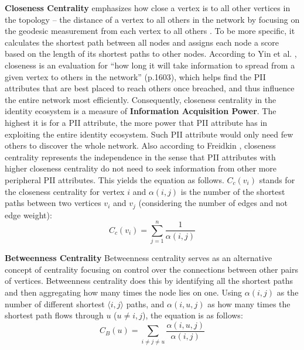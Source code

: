 \documentclass[conference]{IEEEtran}
\begin{document}
\textbf{Closeness Centrality}
  emphasizes how close a vertex is to all other vertices in the topology -- the distance of a vertex to all others in the network by focusing on the geodesic measurement from each vertex to all others  \cite{Freeman79centralityin}. To be more specific, it calculates the shortest path between all nodes and assigns each node a score based on the length of its shortest paths to other nodes. According to Yin et al. \cite{Yin2006}, closeness is an evaluation for ``how long it will take information to spread from a given vertex to others in the network'' (p.1603), which helps find the PII attributes that are best placed to reach others once breached, and thus influence the entire network most efficiently. Consequently, closeness centrality in the identity ecosystem is a measure of {\bf Information Acquisition Power}. The highest it is for a PII attribute, the more power that PII attribute has in exploiting the entire identity ecosystem. Such PII attribute would only need few others to discover the whole network. Also according to Freidkin \cite{Freidkin}, closeness centrality represents the independence in the sense that PII attributes with higher closeness centrality do not need to seek information from other more peripheral PII attributes. 
This yields the equation as follows. $C_{c}(v_{i})$ stands for the closeness centrality for vertex $i$ and $\alpha (i, j)$ is the number of the shortest paths between two vertices $v_i$ and $v_j$ (considering the number of edges and not edge weight):
\begin{equation}
C_{c}(v_{i}) = \sum_{j = 1}^{n} \frac{1}{\alpha (i, j)}
\label{closeness_centrality_equation}
\end{equation}

\textbf{Betweenness Centrality}
Betweenness centrality  \cite{Freeman79centralityin} serves as an alternative concept of centrality focusing on control over the connections between other pairs of vertices. Betweenness centrality does this by identifying all the shortest paths and then aggregating how many times the node lies on one. Using $\alpha (i, j)$ as the number of different shortest $\langle i, j \rangle$ paths, and  $\alpha (i, u, j)$ as how many times the shortest path flows through $u$ ($ u \neq i, j$), the equation is as follows:
\begin{equation}
C_{B}(u) = \sum_{i \neq j \neq u}^{} \frac{\alpha (i, u, j) }{\alpha (i, j)}
\label{betweenness_centrality}
\end{equation}
\end{document}
